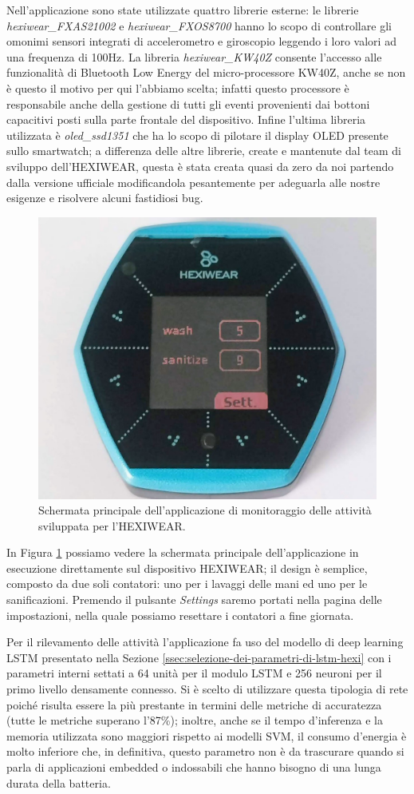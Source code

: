 Nell'applicazione sono state utilizzate quattro librerie esterne: le librerie \textit{hexiwear\_FXAS21002}\cite{fxas21002} e \textit{hexiwear\_FXOS8700}\cite{fxos87700} hanno lo scopo di controllare gli omonimi sensori integrati di accelerometro e giroscopio leggendo i loro valori ad una frequenza di 100Hz. La libreria \textit{hexiwear\_KW40Z}\cite{kw40z} consente l'accesso alle funzionalità di Bluetooth Low Energy del micro-processore KW40Z, anche se non è questo il motivo per qui l'abbiamo scelta; infatti questo processore è responsabile anche della gestione di tutti gli eventi provenienti dai bottoni capacitivi posti sulla parte frontale del dispositivo. Infine l'ultima libreria utilizzata è \textit{oled\_ssd1351}\cite{ssd1351} che ha lo scopo di pilotare il display OLED presente sullo smartwatch; a differenza delle altre librerie, create e mantenute dal team di sviluppo dell'HEXIWEAR, questa è stata creata quasi da zero da noi partendo dalla versione ufficiale modificandola pesantemente per adeguarla alle nostre esigenze e risolvere alcuni fastidiosi bug.

\begin{figure}[!htb]
    \centering
    \includegraphics[width=.4\textwidth]{figure/hexiwear-app.jpg}
    \caption{Schermata principale dell'applicazione di monitoraggio delle attività sviluppata per l'HEXIWEAR.}
    \label{fig:hexiwear-app}
\end{figure}

In Figura \ref{fig:hexiwear-app} possiamo vedere la schermata principale dell'applicazione in esecuzione direttamente sul dispositivo HEXIWEAR; il design è semplice, composto da due soli contatori: uno per i lavaggi delle mani ed uno per le sanificazioni. Premendo il pulsante \textit{Settings} saremo portati nella pagina delle impostazioni, nella quale possiamo resettare i contatori a fine giornata.

Per il rilevamento delle attività l'applicazione fa uso del modello di deep learning LSTM presentato nella Sezione \ref{ssec:selezione-dei-parametri-di-lstm-hexi} con i parametri interni settati a 64 unità per il modulo LSTM e 256 neuroni per il primo livello densamente connesso. Si è scelto di utilizzare questa tipologia di rete poiché risulta essere la più prestante in termini delle metriche di accuratezza (tutte le metriche superano l'87\%); inoltre, anche se il tempo d'inferenza e la memoria utilizzata sono maggiori rispetto ai modelli SVM, il consumo d'energia è molto inferiore che, in definitiva, questo parametro non è da trascurare quando si parla di applicazioni embedded o indossabili che hanno bisogno di una lunga durata della batteria.